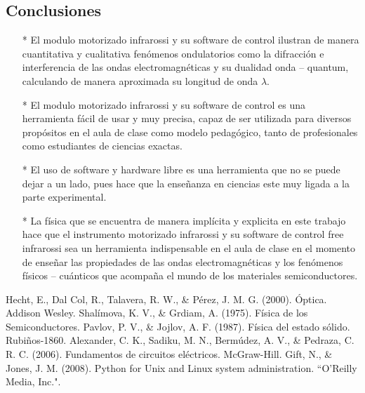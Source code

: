 \documentclass[12]{article}
\begin{document}
\begin{multicols}{2}
\section{Conclusiones}
\begin{enumerate}
\item[*] El modulo motorizado infrarossi y su software de control ilustran de manera cuantitativa y cualitativa fenómenos ondulatorios como la difracción e interferencia de las ondas electromagnéticas y su dualidad onda – quantum, calculando de manera aproximada su longitud de onda $\lambda$.   
\item[*] El modulo motorizado infrarossi y su software de control es una herramienta fácil de usar y muy precisa, capaz de ser utilizada para diversos propósitos en el aula de clase como modelo pedagógico,  tanto de profesionales como estudiantes de ciencias exactas.
\item[*] El uso de software y hardware libre es una herramienta que no se puede dejar a un lado, pues hace que la enseñanza en ciencias este muy ligada a la parte experimental.
\item[*] La física que se encuentra de manera implícita y explicita en este trabajo hace que el instrumento motorizado infrarossi y su software de control free infrarossi sea un herramienta indispensable  en el aula de clase en el momento de enseñar las  propiedades de las ondas electromagnéticas y los fenómenos físicos – cuánticos  que acompaña el mundo de los materiales  semiconductores.
\end{enumerate}
\begin{thebibliography}{99}
 Hecht, E., Dal Col, R., Talavera, R. W., \& Pérez, J. M. G. (2000). Óptica. Addison Wesley.
 Shalímova, K. V., \& Grdiam, A. (1975). Física de los Semiconductores.
 Pavlov, P. V., \& Jojlov, A. F. (1987). Física del estado sólido. Rubiños-1860.
 Alexander, C. K., Sadiku, M. N., Bermúdez, A. V., \& Pedraza, C. R. C. (2006). Fundamentos de circuitos eléctricos. McGraw-Hill. 
 Gift, N., \& Jones, J. M. (2008). Python for Unix and Linux system administration. ``O'Reilly Media, Inc.".
\end{thebibliography}
\end{multicols}
\end{document}
